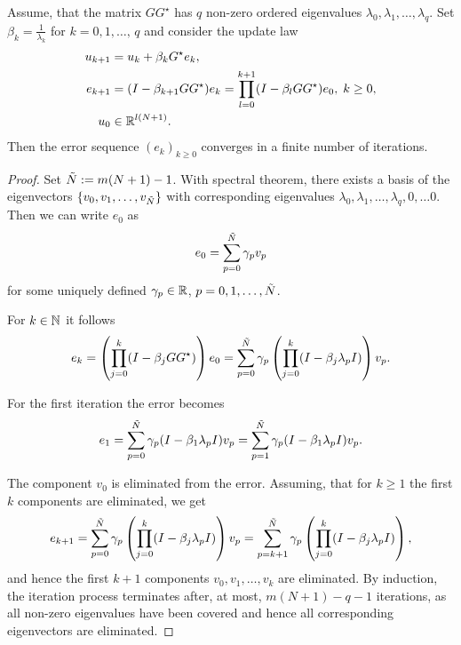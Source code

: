 \begin{theo}
	Assume, that the matrix $GG^\star$ has $q$ non-zero ordered eigenvalues $\lambda_0, \lambda_1, \dots ,  \lambda_q$. Set $\beta_k = \frac{1}{\lambda_k}$ for $k = 0, 1, \dots, \, q$ and consider the update law
	\begin{align}
	\label{eq:cl_var0}
	\begin{split}
	u_{k+1} &= u_k + \beta_k G^\star e_k, \\
	e _{k+1} &= (I - \beta_{k+1}  GG^\star) e_{k}  = \prod_{l = 0}^{k+1} (I - \beta_{l}  GG^\star) e_0, \; k\geq 0,\\
	u_0 &\in {\mathbb{R}}^{l (N+1)}.
	\end{split}
	\end{align}
	Then the error sequence $(e_k)_{k\geq 0}$ converges in a finite number of iterations.     
\end{theo}
\begin{proof} 
	Set $\tilde{N} := m(N+1) - 1$. With spectral theorem, there exists a basis of the eigenvectors $\{v_0, v_1, \dots, v_{\tilde{N}}\}$ with corresponding eigenvalues $\lambda_0, \lambda_1, \dots, \lambda_q, 0, \dots 0$. 
	Then we can write $e_0$ as 
	\begin{align}
	e_0 = \sum_{p = 0}^{\tilde{N}} \gamma_p v_p
	\end{align}
	for some uniquely defined $\gamma_p \in {\mathbb{R}}$, $p = 0, 1, \dots, \tilde{N}$. 
	
	For $k \in {\mathbb{N}}$ it follows 
	\begin{align}
	e_k = \left(\prod_{j=0}^k(I - \beta_j G G^\star)\right)e_0 = \sum_{p = 0}^{\tilde{N}} \gamma_p \left(\prod_{j=0}^k (I - \beta_j \lambda_p I)\right)v_p.
	\end{align}
	
	For the first iteration the error becomes 
	\begin{align}
	e_1 = \sum_{p = 0}^{\tilde{N}} \gamma_p ( I - \beta_1 \lambda_p I) v_p = \sum_{p=1}^{\tilde{N} } \gamma_p ( I - \beta_1 \lambda_p I) v_p.
	\end{align}
	
	The component $v_0$ is eliminated from the error.
	Assuming, that for $k \geq 1$ the first $k$ components are eliminated, we get 
	\begin{align}
	e_{k+1} = \sum_{p = 0}^{\tilde{N}} \gamma_p \left(\prod_{j=0}^k (I - \beta_j \lambda_p I)\right)v_p = \sum_{p = k + 1}^{\tilde{N}} \gamma_p \left(\prod_{j = 0}^k (I - \beta_j \lambda_p I )\right),
	\end{align}
	and hence the first $k+1$ components $v_0, v_1, \dots, v_k$ are eliminated. 
	By induction, the iteration process terminates after, at most,  $m(N+1) - q - 1$ iterations, as all non-zero eigenvalues have been covered and hence all corresponding eigenvectors are eliminated.	
\end{proof}

